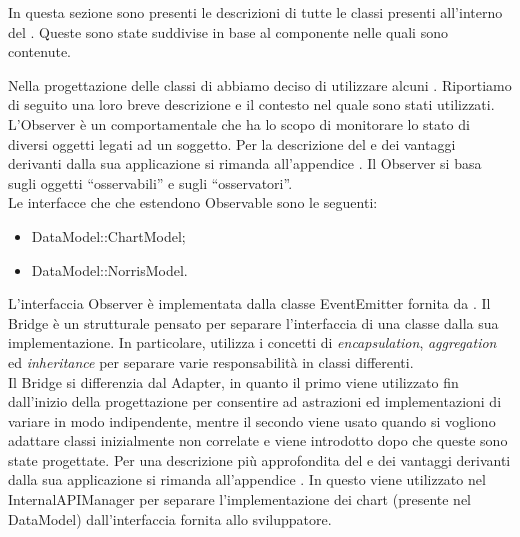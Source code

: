 		In questa sezione sono presenti le descrizioni di tutte le classi presenti all'interno del  . Queste sono state suddivise in base al componente nelle quali sono contenute.
		
		
	
		Nella progettazione delle classi di  abbiamo deciso di utilizzare alcuni . Riportiamo di seguito una loro breve descrizione e il contesto nel quale sono stati utilizzati.
		L'Observer è un  comportamentale che ha lo scopo di monitorare lo stato di diversi oggetti legati ad un soggetto.
		Per la descrizione del  e dei vantaggi derivanti dalla sua applicazione si rimanda all'appendice .
			Il  Observer si basa sugli oggetti “osservabili” e sugli “osservatori”.\\
			Le interfacce che che estendono Observable sono le seguenti:
			\begin{itemize}
				\item DataModel::ChartModel;
				\item DataModel::NorrisModel.
			\end{itemize}
			L'interfaccia Observer è implementata dalla classe EventEmitter fornita da .
		Il Bridge è un  strutturale pensato per separare l'interfaccia di una classe dalla sua implementazione. In particolare, utilizza i concetti di \textit{encapsulation}, \textit{aggregation} ed \textit{inheritance} per separare varie responsabilità in classi differenti. \\
		Il  Bridge si differenzia dal  Adapter, in quanto il primo viene utilizzato fin dall'inizio della progettazione per consentire ad astrazioni ed implementazioni di variare in modo indipendente, mentre il secondo viene usato quando si vogliono adattare classi inizialmente non correlate e viene introdotto dopo che queste sono state progettate.
		Per una descrizione più approfondita del  e dei vantaggi derivanti dalla sua applicazione si rimanda all'appendice .
			In  questo  viene utilizzato nel  InternalAPIManager per separare l'implementazione dei chart (presente nel  DataModel) dall'interfaccia fornita allo sviluppatore.	
